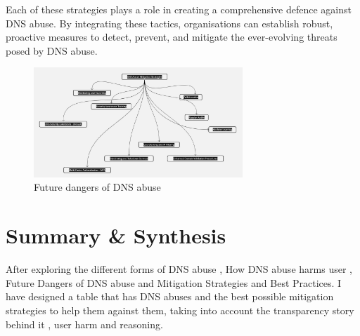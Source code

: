 Each of these strategies plays a role in creating a comprehensive defence against DNS abuse. By integrating these tactics, organisations can establish robust, proactive measures to detect, prevent, and mitigate the ever-evolving threats posed by DNS abuse.

\captionsetup{font= footnotesize}
\begin{figure}[H]
\centering
\includegraphics[width=0.7\textwidth]{background/DNSabuseMiti.jpg}
\caption{Future dangers of DNS abuse}
\label{fig:figureSix}
\end{figure}




\section{Summary \& Synthesis}

After exploring the different forms of DNS abuse , How DNS abuse harms user , Future Dangers of DNS abuse and Mitigation Strategies and Best Practices. I have designed a table that has DNS abuses and the best possible mitigation strategies to help them against them, taking into account the transparency story behind it , user harm and reasoning. 

